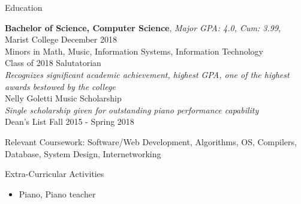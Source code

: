 \documentclass{edit} %
\begin{document}
\begin{rSection}{Education}

{\bf Bachelor of Science, Computer Science}, {\textit{Major GPA: 4.0, Cum: 3.99}}, Marist College \hfill {December 2018}\\
\small Minors in Math, Music, Information Systems, Information Technology \smallskip \\
Class of 2018 Salutatorian\\
\textit{Recognizes significant academic achievement, highest GPA, one of the highest awards bestowed by the college} \vspace{1mm}\\
Nelly Goletti Music Scholarship\\
\textit{Single scholarship given for outstanding piano performance capability} \vspace{1mm}\\
Dean's List Fall 2015 - Spring 2018

\small Relevant Coursework: Software/Web Development, Algorithms, OS, Compilers, Database, System Design, Internetworking

\end{rSection}

\begin{rSection}{Extra-Curricular Activities}
\begin{itemize}
    \itemsep -3pt {}
    \item 	Piano, Piano teacher
\end{itemize}

\end{rSection}
\end{document}
